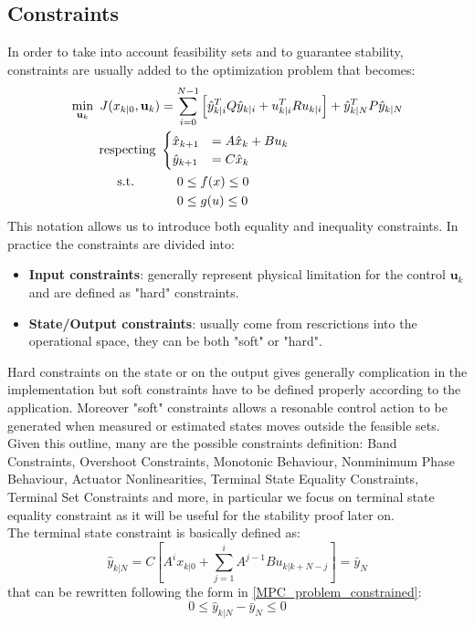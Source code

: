 \subsection{Constraints}

In order to take into account feasibility sets and to guarantee stability, constraints are usually added to the optimization problem that becomes: 
\begin{equation} \label{MPC_problem_constrained}
\begin{split}
		\min_{\textbf{u}_k}\ J(x_{k|0},\textbf{u}_k)&= \sum_{i=0}^{N-1} \left[\hat{y}_{k|i}^T Q \hat{y}_{k|i} + u_{k|i}^TRu_{k|i} \right] + \hat{y}_{k|N}^T P \hat{y}_{k|N} \\
		\textnormal{respecting}\ & 	
		\begin{cases}
			\hat{x}_{k+1}&=A\hat{x}_k+Bu_k \\
			\hat{y}_{k+1}&=C\hat{x}_k
		\end{cases} \\
		\textnormal{s.t.}\qquad
		&\ \ \ \ 0 \leq f(x)\leq 0 \\
		&\ \ \ \ 0 \leq g(u)\leq 0 \\
	\end{split}	
\end{equation}
This notation allows us to introduce both equality and inequality constraints. In practice the constraints are divided into: 
\begin{itemize}
 \item \textbf{Input constraints}: generally represent physical limitation for the control $\textbf{u}_k$ and are defined as "hard" constraints.
 	\item \textbf{State/Output constraints}: usually come from rescrictions into the operational space, they can be both "soft" or "hard".
\end{itemize} 

Hard constraints on the state or on the output gives generally complication in the implementation but soft constraints have to be defined properly according to the application. Moreover "soft" constraints allows a resonable control action to be generated when measured or estimated states moves outside the feasible sets.\\
Given this outline, many are the possible constraints definition: Band Constraints, Overshoot Constraints, Monotonic Behaviour, Nonminimum Phase Behaviour, Actuator Nonlinearities, Terminal State Equality Constraints, Terminal Set Constraints and more, in particular we focus on terminal state equality constraint as it will be useful for the stability proof later on. \\
The terminal state constraint is basically defined as: 
\begin{equation}
\hat{y}_{k|N}=C\left[A^i x_{k|0} + \sum_{j=1}^{i} A^{j-1}Bu_{k|k+N-j}\right]=\bar{y}_N
\end{equation}
that can be rewritten following the form in \ref{MPC_problem_constrained}: 
\begin{equation}
0 \leq \hat{y}_{k|N}-\bar{y}_N \leq 0
\end{equation} 

